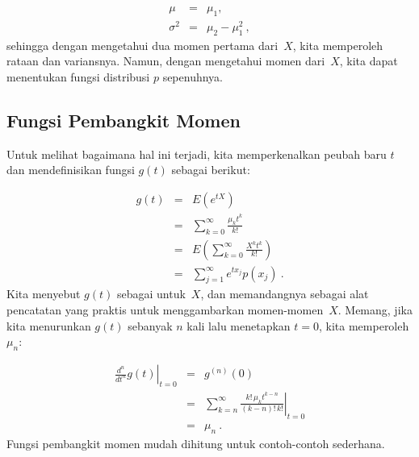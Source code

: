 \begin{eqnarray*}
     \mu &=& \mu_1, \\
\sigma^2 &=& \mu_2 - \mu_1^2\ ,
\end{eqnarray*}
sehingga dengan mengetahui dua momen pertama dari~$X$, kita memperoleh rataan dan
variansnya.  Namun, dengan mengetahui  momen dari~$X$, kita dapat menentukan
fungsi distribusi $p$ sepenuhnya.

\subsection*{Fungsi Pembangkit Momen}
Untuk melihat bagaimana hal ini terjadi, kita memperkenalkan peubah baru $t$ dan mendefinisikan
fungsi $g(t)$ sebagai berikut:

\begin{eqnarray*}
g(t) &=& E(e^{tX}) \\
     &=& \sum_{k = 0}^\infty \frac {\mu_k t^k}{k!} \\
     &=& E\left(\sum_{k = 0}^\infty \frac {X^k t^k}{k!} \right) \\
     &=& \sum_{j = 1}^\infty e^{tx_j} p(x_j)\ .
\end{eqnarray*}
Kita menyebut $g(t)$ sebagai  untuk~$X$, dan memandangnya sebagai alat
pencatatan yang praktis untuk menggambarkan momen-momen~$X$.  Memang, jika kita menurunkan $g(t)$ sebanyak $n$
kali lalu menetapkan
$t = 0$, kita memperoleh $\mu_n$:

\begin{eqnarray*}
\left. \frac {d^n}{dt^n} g(t) \right|_{t = 0} &=& g^{(n)}(0) \\
     &=& \left. \sum_{k = n}^\infty \frac {k!\, \mu_k t^{k - n}} {(k - n)!\, k!}
\right|_{t = 0} \\
     &=& \mu_n\ .
\end{eqnarray*}
Fungsi pembangkit momen mudah dihitung untuk contoh-contoh sederhana.


